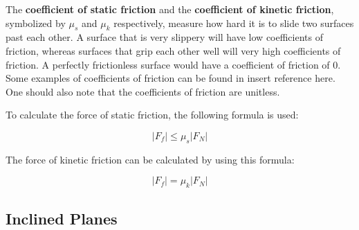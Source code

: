 		The \textbf{coefficient of static friction}  and the \textbf{coefficient of kinetic friction}, symbolized by $\mu_s$ and $\mu_k$ respectively, measure how hard it is to slide two surfaces past each other.  A surface that is very slippery will have low coefficients of friction, whereas surfaces that grip each other well will very high coefficients of friction. A perfectly frictionless surface would have a coefficient of friction of 0.  Some examples of coefficients of friction can be found in \color{red} insert reference here\color{black}.  One should also note that the coefficients of friction are unitless.  
		
		To calculate the force of static friction, the following formula is used:
		\begin{mdframed}[backgroundcolor=orange!20!white]
			\begin{equation}
				|F_f| \leq \mu_s |F_N|  
				\label{eqn:frictionstatic}
			\end{equation}
		\end{mdframed}
	
	The force of kinetic friction can be calculated by using this formula:
			\begin{mdframed}[backgroundcolor=orange!20!white]
		\begin{equation}
			|F_f| = \mu_k |F_N|  
			\label{eqn:frictionkinetic}
		\end{equation}
	\end{mdframed}
		
		
		
		\subsection{Inclined Planes}
		
